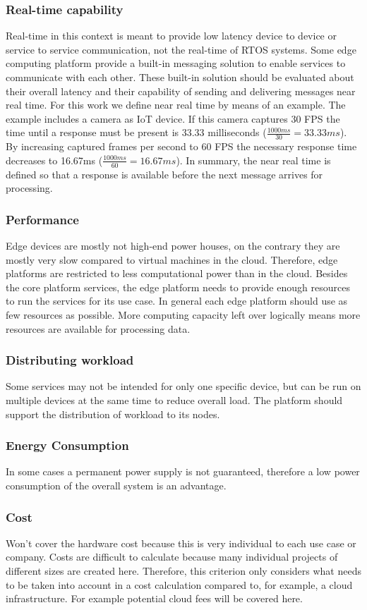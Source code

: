 \subsubsection*{Real-time capability}
Real-time in this context is meant to provide low latency device to device or service to service communication, not the real-time of \gls{RTOS} systems. Some edge computing platform provide a built-in messaging solution to enable services to communicate with each other. These built-in solution should be evaluated about their overall latency and their capability of sending and delivering messages near real time. For this work we define near real time by means of an example. The example includes a camera as \gls{IoT} device. If this camera captures 30 \gls{FPS} the time until a response must be present is 33.33 milliseconds (\( \frac{1000ms}{30} = 33.33ms \)). By increasing captured frames per second to 60 \gls{FPS} the necessary response time decreases to 16.67ms (\( \frac{1000ms}{60} = 16.67ms \)). In summary, the near real time is defined so that a response is available before the next message arrives for processing.

\subsubsection*{Performance}
Edge devices are mostly not high-end power houses, on the contrary they are mostly very slow compared to virtual machines in the cloud. Therefore, edge platforms are restricted to less computational power than in the cloud. Besides the core platform services, the edge platform needs to provide enough resources to run the services for its use case. In general each edge platform should use as few resources as possible. More computing capacity left over logically means more resources are available for processing data.

\subsubsection*{Distributing workload}
Some services may not be intended for only one specific device, but can be run on multiple devices at the same time to reduce overall load. The platform should support the distribution of workload to its nodes. 

\subsubsection*{Energy Consumption}
In some cases a permanent power supply is not guaranteed, therefore a low power consumption of the overall system is an advantage.

\subsubsection*{Cost}
Won't cover the hardware cost because this is very individual to each use case or company. Costs are difficult to calculate because many individual projects of different sizes are created here. Therefore, this criterion only considers what needs to be taken into account in a cost calculation compared to, for example, a cloud infrastructure. For example potential cloud fees will be covered here.
